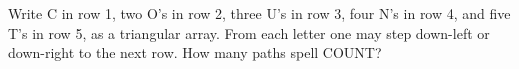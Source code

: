 Write C in row 1, two O's in row 2, three U's in row 3, four N's in row 4, and five T's in row 5, as a triangular array. From each letter one may step down-left or down-right to the next row. How many paths spell COUNT?
